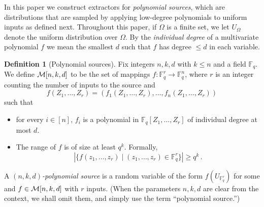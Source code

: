 \documentclass[10pt]{article}
\theoremstyle{definition}
\newtheorem{definition}[theorem]{Definition}
\numberwithin{equation}{section}
\newcommand{\F}{\mathbb F_q}
\newcommand{\M}[3]{{\cal M}[#1,#2,#3]}
\begin{document}
%
%
%
In this paper we construct extractors for \emph{polynomial sources},
which are distributions that are sampled by applying low-degree
%
polynomials to uniform inputs as defined next.
%
%
%
Throughout this paper, if $\Omega$ is a finite set, we let
$U_\Omega$ denote the uniform distribution over $\Omega$.
%
%
By the \emph{individual degree} of a multivariate polynomial $f$ we
mean the smallest $d$ such that $f$ has degree $\le d$
in each variable.


\begin{definition}[Polynomial sources]\label{dfn-polysource}
Fix integers $n,k,d$ with $k\leq n$ and a field $\F$.
We define $\M{n}{k}{d}$ to be the set of mappings $f:\F^r\to\F^n$,
where $r$ is an integer counting the number of inputs to the source and
\[f(Z_1,\ldots,Z_r)=(f_1(Z_1,\ldots,Z_r),\ldots,f_n(Z_1,\ldots,Z_r))\] such that
\begin{itemize}
\item for every $i\in [n]$, $f_i$ is a polynomial in $\F[Z_1,\ldots,Z_r]$
of individual degree at most $d$.
\item The range
%
%
%
%
%
%
%
of $f$ is of size at least $q^k$. Formally,
\[|\{f(z_1,\ldots,z_r)\mid (z_1,\ldots,z_r)\in \F^r\}| \geq q^k\,.\]
\end{itemize}
%
A \emph{$(n,k,d)$-polynomial source} is a random variable of the form
$f(U_{\F^r})$ for some and $f\in \M{n}{k}{d}$ with $r$ inputs.
(When the parameters $n,k,d$ are clear from
%
%
the context, we shall omit them, and simply use the term
``polynomial source.'')

\end{definition}
\end{document}
